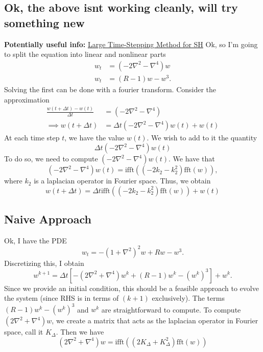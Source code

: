 \documentclass[12pt]{article}
\begin{document}
\subsection{Ok, the above isnt working cleanly, will try something new}
\textbf{Potentially useful info:} \href{https://doc.global-sci.org/uploads/Issue/AAMM/v6n8/68_992.pdf?code=hRTPxYNkNkl8Nna6NkluHg%3D%3D}{Large Time-Stepping Method for SH}
Ok, so I'm going to split the equation into linear and nonlinear parts
\begin{align*}
    w_t &= \left(-2\nabla^2-\nabla^4\right)w\\
    w_t &= (R-1)w - w^3.
\end{align*}
Solving the first can be done with a fourier transform.
Consider the approximation
\begin{align*}
    \frac{w(t+\Delta t)-w(t)}{\Delta t} &= \left( -2\nabla^2 - \nabla^4\right)\\
    \implies w(t+\Delta t) &= \Delta t \left( -2\nabla^2 - \nabla^4 \right)w(t) + w(t)
\end{align*}
At each time step $t$, we have the value $w(t)$. We wish to add to it the quantity
\[
\Delta t \left( -2\nabla^2 - \nabla^4 \right)w(t)
\] 
To do so, we need to compute $\left( -2\nabla^2 - \nabla^4 \right)w(t)$.
We have that
\[
    \left( -2\nabla^2 - \nabla^4 \right)w(t) = \text{ifft}((-2k_2-k_2^2)\text{fft}(w)),
\] 
where $k_2$ is a laplacian operator in Fourier space. Thus, we obtain
\[
 w(t+\Delta t) = \Delta t \text{ifft}((-2k_2-k_2^2)\text{fft}(w)) + w(t)
\] 
\subsection{Naive Approach}
Ok, I have the PDE
\[
w_t = -(1+\nabla^2)^2w+Rw-w^3.
\] 
Discretizing this, I obtain
\[
    w^{k+1} = \Delta t \left[ -(2\nabla^2+\nabla^4)w^k + (R-1)w^k-(w^k)^3\right]+w^k.
\] 
Since we provide an initial condition, this should be a feasible approach to evolve the system (since RHS is in terms of $(k+1)$ exclusively).
The terms $(R-1)w^k-(w^k)^3$ and $w^k$ are straightforward to compute.
To compute $(2\nabla^2+\nabla^4)w$, we create a matrix that acts as the laplacian operator in Fourier space, call it $K_{\Delta}$.
Then we have
\[
    (2\nabla^2+\nabla^4)w = \text{ifft}((2K_{\Delta}+K_{\Delta}^2)\text{fft}(w))
\] 
\end{document}

